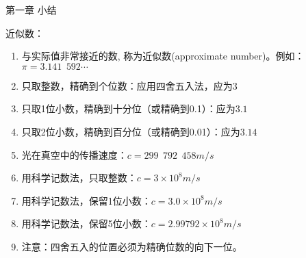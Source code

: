 \documentclass[aspectratio=169]{ctexbeamer} %
\begin{document}
\begin{frame}[t]{第一章 小结}
\begin{spacing}{1.2}
\normalsize
\alert{近似数：}
\begin{enumerate}[label={\arabic*.}]
\item 与实际值非常接近的数, 称为近似数(approximate number)。例如：\\
$\pi = 3.141\phantom{e}592\cdots$
\item 只取整数，精确到个位数：应用四舍五入法，应为$3$
\item 只取1位小数，精确到十分位（或精确到0.1）：应为$3.1$
\item 只取2位小数，精确到百分位（或精确到0.01）：应为$3.14$
\item 光在真空中的传播速度：$c=299 \phantom{e} 792 \phantom{e} 458m/s$
\item 用科学记数法，只取整数：$c=3×10^8m/s$
\item 用科学记数法，保留1位小数：$c=3.0×10^8m/s$
\item 用科学记数法，保留5位小数：$c=2.99792×10^8m/s$
\item 注意：四舍五入的位置必须为精确位数的向下一位。
\end{enumerate}

\end{spacing}
\end{frame}
\end{document}
